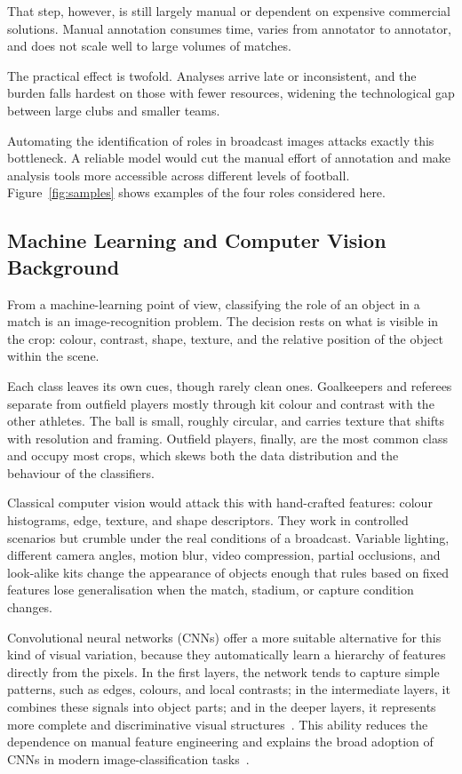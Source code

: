 \documentclass[preprint,12pt]{elsarticle}
\begin{document}
That step, however, is still largely manual or dependent on expensive commercial solutions. Manual annotation consumes time, varies from annotator to annotator, and does not scale well to large volumes of matches.

The practical effect is twofold. Analyses arrive late or inconsistent, and the burden falls hardest on those with fewer resources, widening the technological gap between large clubs and smaller teams.

Automating the identification of roles in broadcast images attacks exactly this bottleneck. A reliable model would cut the manual effort of annotation and make analysis tools more accessible across different levels of football. Figure~\ref{fig:samples} shows examples of the four roles considered here.

\subsection{Machine Learning and Computer Vision Background}
From a machine-learning point of view, classifying the role of an object in a match is an image-recognition problem. The decision rests on what is visible in the crop: colour, contrast, shape, texture, and the relative position of the object within the scene.

Each class leaves its own cues, though rarely clean ones. Goalkeepers and referees separate from outfield players mostly through kit colour and contrast with the other athletes. The ball is small, roughly circular, and carries texture that shifts with resolution and framing. Outfield players, finally, are the most common class and occupy most crops, which skews both the data distribution and the behaviour of the classifiers.

Classical computer vision would attack this with hand-crafted features: colour histograms, edge, texture, and shape descriptors. They work in controlled scenarios but crumble under the real conditions of a broadcast. Variable lighting, different camera angles, motion blur, video compression, partial occlusions, and look-alike kits change the appearance of objects enough that rules based on fixed features lose generalisation when the match, stadium, or capture condition changes.

Convolutional neural networks (CNNs) offer a more suitable alternative for this kind of visual variation, because they automatically learn a hierarchy of features directly from the pixels. In the first layers, the network tends to capture simple patterns, such as edges, colours, and local contrasts; in the intermediate layers, it combines these signals into object parts; and in the deeper layers, it represents more complete and discriminative visual structures~\cite{krizhevsky2012imagenet,simonyan2015very}. This ability reduces the dependence on manual feature engineering and explains the broad adoption of CNNs in modern image-classification tasks~\cite{he2016deep,deng2009imagenet}.
\end{document}
